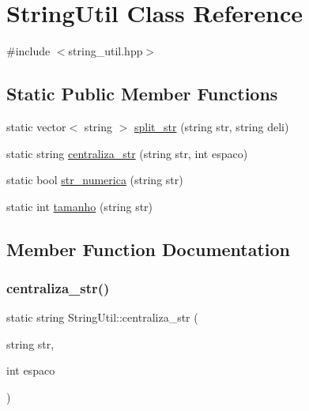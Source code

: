 \hypertarget{classStringUtil}{}\section{String\+Util Class Reference}
\label{classStringUtil}


{\ttfamily \#include $<$string\+\_\+util.\+hpp$>$}

\subsection*{Static Public Member Functions}
\begin{DoxyCompactItemize}
\item 
static vector$<$ string $>$ \hyperlink{classStringUtil_a317755bea8c956f173b28b18105c1cd5}{split\+\_\+str} (string str, string deli)
\item 
static string \hyperlink{classStringUtil_adf2e170a4188212a17452c968f50e0dd}{centraliza\+\_\+str} (string str, int espaco)
\item 
static bool \hyperlink{classStringUtil_af3da5d9d1b581638b5c76257ab201e62}{str\+\_\+numerica} (string str)
\item 
static int \hyperlink{classStringUtil_ab01f3cadbd7d67bf15d2bb06db0b1c8e}{tamanho} (string str)
\end{DoxyCompactItemize}


\subsection{Member Function Documentation}
\mbox{\label{classStringUtil_adf2e170a4188212a17452c968f50e0dd}} 
\subsubsection{\texorpdfstring{centraliza\+\_\+str()}{centraliza\_str()}}
{\footnotesize\ttfamily static string String\+Util\+::centraliza\+\_\+str (\begin{DoxyParamCaption}\item[{string}]{str,  }\item[{int}]{espaco }\end{DoxyParamCaption})\hspace{0.3cm}{\ttfamily [static]}}

